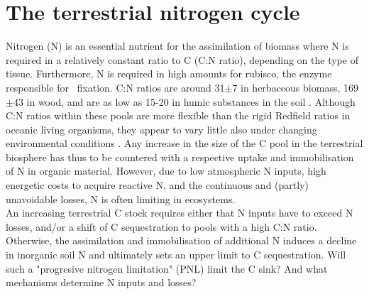 \section{The terrestrial nitrogen cycle}
\label{sec:ncycle}
Nitrogen (N) is an essential nutrient for the assimilation of biomass where N is required in a relatively constant ratio to C (C:N ratio), depending on the type of tissue. Furthermore, N is required in high amounts for rubisco, the enzyme responsible for \coo\ fixation. C:N ratios are around 31$\pm$7 in herbaceous biomass, 169$\pm$43 in wood, and are as low as 15-20 in humic substances in the soil \citep{esser11}. Although C:N ratios within these pools are more flexible than the rigid Redfield ratios in oceanic living organisms, they appear to vary little also under changing environmental conditions \citep{norby01}. Any increase in the size of the C pool in the terrestrial biosphere has thus to be countered with a respective uptake and immobilisation of N in organic material. However, due to low atmospheric N inputs, high energetic costs to acquire reactive N, and the continuous and (partly) unavoidable losses, N is often limiting in ecosystems.\\

An increasing terrestrial C stock requires either that N inputs have to exceed N losses, and/or a shift of C sequestration to pools with a high C:N ratio. Otherwise, the assimilation and immobilisation of additional N induces a decline in inorganic soil N and ultimately sets an upper limit to C sequestration. Will such a "progresive nitrogen limitation" (PNL) \citep{luo04} limit the C sink? And what mechanisms determine N inputs and losses?

